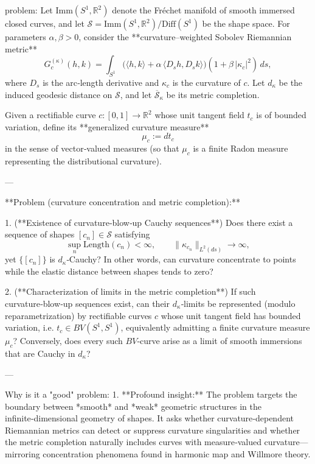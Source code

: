 problem:  
Let \(\mathrm{Imm}(S^{1},\mathbb{R}^{2})\) denote the Fréchet manifold of smooth immersed closed curves, and let  
\(\mathcal{S} = \mathrm{Imm}(S^{1},\mathbb{R}^{2}) / \mathrm{Diff}(S^{1})\) be the shape space.  
For parameters \(\alpha,\beta>0\), consider the **curvature–weighted Sobolev Riemannian metric**
\[
G^{(\kappa)}_c(h,k)
   = \int_{S^{1}}\!
      \big(\langle h,k\rangle + \alpha\,\langle D_s h, D_s k\rangle\big)
      (1 + \beta\,|\kappa_c|^{2})\,ds,
\]
where \(D_s\) is the arc‑length derivative and \(\kappa_c\) is the curvature of \(c\).  
Let \(d_{\kappa}\) be the induced geodesic distance on \(\mathcal{S}\), and let \(\overline{\mathcal{S}}_{\kappa}\) be its metric completion.

Given a rectifiable curve \(c:[0,1]\to\mathbb{R}^{2}\) whose unit tangent field \(t_c\) is of bounded variation, define its **generalized curvature measure**
\[
\mu_c := dt_c
\]
in the sense of vector‑valued measures (so that \(\mu_c\) is a finite Radon measure representing the distributional curvature).

---

**Problem (curvature concentration and metric completion):**

1. (**Existence of curvature‑blow‑up Cauchy sequences**)  
   Does there exist a sequence of shapes \([c_n]\in \mathcal{S}\) satisfying  
   \[
   \sup_{n}\mathrm{Length}(c_n) < \infty,\qquad 
   \|\kappa_{c_n}\|_{L^2(ds)} \to \infty,
   \]
   yet \(\{[c_n]\}\) is \(d_{\kappa}\)‑Cauchy?  
   In other words, can curvature concentrate to points while the elastic distance between shapes tends to zero?

2. (**Characterization of limits in the metric completion**)  
   If such curvature‑blow‑up sequences exist, can their \(d_{\kappa}\)‑limits be represented (modulo reparametrization) by rectifiable curves \(c\) whose unit tangent field has bounded variation, i.e. \(t_c\in BV(S^1,S^1)\), equivalently admitting a finite curvature measure \(\mu_c\)?  
   Conversely, does every such \(BV\)‑curve arise as a limit of smooth immersions that are Cauchy in \(d_{\kappa}\)?

---

Why is it a "good" problem:  
1. **Profound insight:**  
   The problem targets the boundary between *smooth* and *weak* geometric structures in the infinite‑dimensional geometry of shapes. It asks whether curvature‑dependent Riemannian metrics can detect or suppress curvature singularities and whether the metric completion naturally includes curves with measure‑valued curvature—mirroring concentration phenomena found in harmonic map and Willmore theory.


